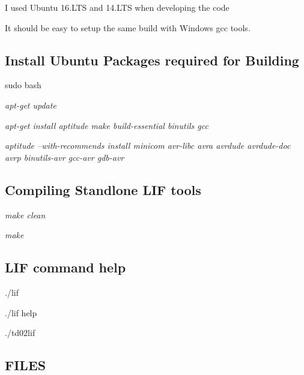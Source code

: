 \begin{DoxyItemize}
\item I used Ubuntu 16.\+L\+TS and 14.\+L\+TS when developing the code
\begin{DoxyItemize}
\item It should be easy to setup the same build with Windows gcc tools. 


\end{DoxyItemize}
\end{DoxyItemize}

\subsection*{Install Ubuntu Packages required for Building}


\begin{DoxyItemize}
\item sudo bash
\item {\itshape apt-\/get update}
\item {\itshape apt-\/get install aptitude make build-\/essential binutils gcc}
\item {\itshape aptitude --with-\/recommends install minicom avr-\/libc avra avrdude avrdude-\/doc avrp binutils-\/avr gcc-\/avr gdb-\/avr}
\end{DoxyItemize}



 \subsection*{Compiling Standlone L\+IF tools}


\begin{DoxyItemize}
\item {\itshape make clean}
\item {\itshape make} 

 \subsection*{L\+IF command help}
\end{DoxyItemize}


\begin{DoxyItemize}
\item ./lif
\item ./lif help
\item ./td02lif
\end{DoxyItemize}



 \subsection*{F\+I\+L\+ES}


